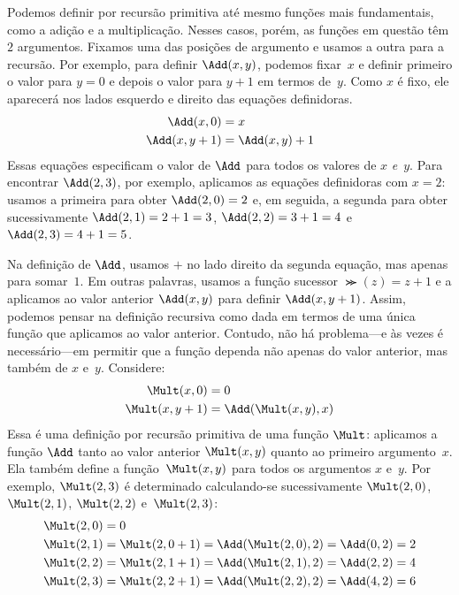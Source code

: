 \documentclass[../../../include/open-logic-section]{subfiles}
\begin{document}
Podemos definir por recursão primitiva até mesmo funções mais fundamentais,
como a adição e a multiplicação. Nesses casos, porém, as funções em questão
têm $2$ argumentos. Fixamos uma das posições de argumento e usamos a outra
para a recursão. Por exemplo, para definir $\Add(x, y)$, podemos fixar~$x$ e
definir primeiro o valor para $y=0$ e depois o valor para $y+1$ em termos
de~$y$. Como $x$ é fixo, ele aparecerá nos lados esquerdo e direito das
equações definidoras.
\begin{align*}
\Add(x,0) & =  x\\
\Add(x,y+1) & =  \Add(x,y)+1
\end{align*}
Essas equações especificam o valor de $\Add$ para todos os valores de $x$
\emph{e}~$y$. Para encontrar $\Add(2,3)$, por exemplo, aplicamos as equações
definidoras com $x = 2$: usamos a primeira para obter $\Add(2,0) = 2$ e, em
seguida, a segunda para obter sucessivamente $\Add(2,1) = 2 + 1 = 3$,
$\Add(2, 2) = 3 + 1 = 4$ e $\Add(2, 3) = 4 + 1 = 5$.

Na definição de $\Add$, usamos $+$ no lado direito da segunda equação, mas
apenas para somar~$1$. Em outras palavras, usamos a função sucessor
$\Succ(z) = z+1$ e a aplicamos ao valor anterior $\Add(x,y)$ para definir
$\Add(x,y+1)$. Assim, podemos pensar na definição recursiva como dada em
termos de uma única função que aplicamos ao valor anterior. Contudo, não há
problema---e às vezes é necessário---em permitir que a função dependa não
apenas do valor anterior, mas também de $x$ e~$y$. Considere:
\begin{align*}
  \Mult(x,0) & =  0 \\
  \Mult(x,y+1) & =  \Add(\Mult(x,y),x)
\end{align*}
Essa é uma definição por recursão primitiva de uma função $\Mult$: aplicamos
a função $\Add$ tanto ao valor anterior $\Mult(x,y)$ quanto ao primeiro
argumento~$x$. Ela também define a função~$\Mult(x,y)$ para todos os
argumentos $x$ e~$y$. Por exemplo, $\Mult(2,3)$ é determinado calculando-se
sucessivamente $\Mult(2,0)$, $\Mult(2,1)$, $\Mult(2,2)$ e~$\Mult(2,3)$:
\begin{align*}
  \Mult(2,0) & = 0\\
  \Mult(2,1) & = \Mult(2,0+1) =
  \Add(\Mult(2,0), 2) = \Add(0, 2) = 2\\
  \Mult(2,2) & = \Mult(2,1+1) =
  \Add(\Mult(2,1), 2) = \Add(2, 2) = 4\\
  \Mult(2,3) & = \Mult(2,2+1) =
  \Add(\Mult(2,2), 2) = \Add(4, 2) = 6
\end{align*}
\end{document}

